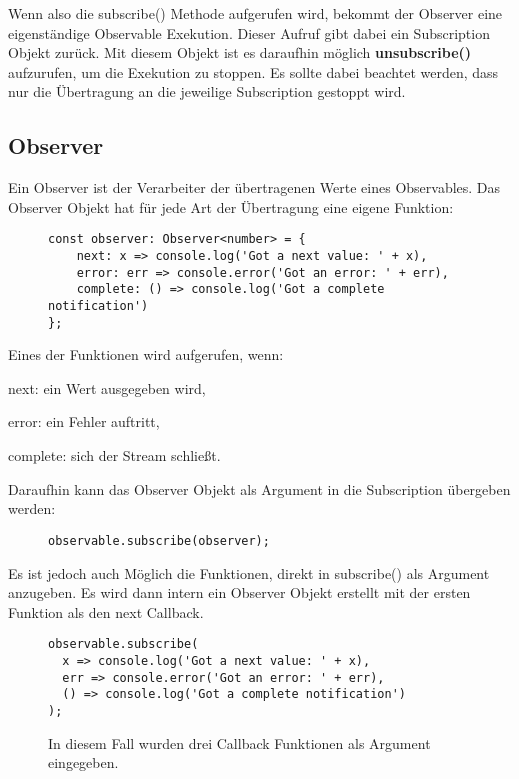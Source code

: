 \noindent
Wenn also die subscribe() Methode aufgerufen wird, bekommt der Observer eine eigenständige Observable Exekution. Dieser Aufruf gibt dabei ein Subscription Objekt zurück. Mit diesem Objekt ist es daraufhin möglich \textbf{unsubscribe()} aufzurufen, um die Exekution zu stoppen. Es sollte dabei beachtet werden, dass nur die Übertragung an die jeweilige Subscription gestoppt wird.

\subsection{Observer}

Ein Observer ist der Verarbeiter der übertragenen Werte eines Observables. Das Observer Objekt hat für jede Art der Übertragung eine eigene Funktion:

\begin{figure}[H]
\begin{lstlisting}[basicstyle=\small]
const observer: Observer<number> = {
    next: x => console.log('Got a next value: ' + x),
    error: err => console.error('Got an error: ' + err),
    complete: () => console.log('Got a complete notification')
};
\end{lstlisting}
\end{figure}

\noindent
Eines der Funktionen wird aufgerufen, wenn:

\begin{description}
\item next: ein Wert ausgegeben wird,
\item error: ein Fehler auftritt,
\item complete: sich der Stream schließt.
\end{description}

\noindent
Daraufhin kann das Observer Objekt als Argument in die Subscription übergeben werden:

\begin{figure}[H]
\begin{lstlisting}[basicstyle=\small]
observable.subscribe(observer);
\end{lstlisting}
\end{figure}

\noindent
Es ist jedoch auch Möglich die Funktionen, direkt in subscribe() als Argument anzugeben. Es wird dann intern ein Observer Objekt erstellt mit der ersten Funktion als den next Callback.

\begin{figure}[H]
\begin{lstlisting}[basicstyle=\small]
observable.subscribe(
  x => console.log('Got a next value: ' + x),
  err => console.error('Got an error: ' + err),
  () => console.log('Got a complete notification')
);
\end{lstlisting}
\caption{In diesem Fall wurden drei Callback Funktionen als Argument eingegeben.}
\end{figure}

